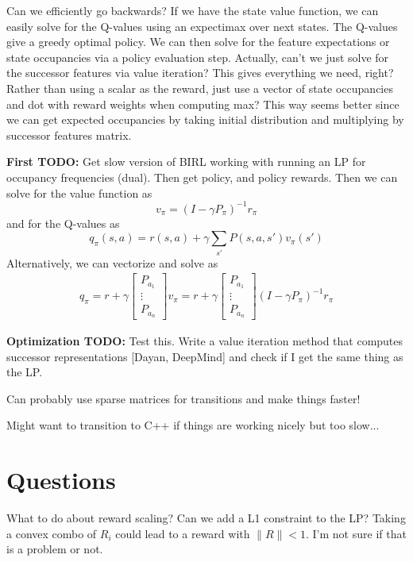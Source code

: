 \documentclass{article}
\begin{document}
Can we efficiently go backwards? If we have the state value function, we can easily solve for the Q-values using an expectimax over next states. The Q-values give a greedy optimal policy. We can then solve for the feature expectations or state occupancies via a policy evaluation step. Actually, can't we just solve for the successor features via value iteration? This gives everything we need, right? Rather than using a scalar as the reward, just use a vector of state occupancies and dot with reward weights when computing max? This way seems better since we can get expected occupancies by taking initial distribution and multiplying by successor features matrix. 

\textbf{First TODO:}
Get slow version of BIRL working with running an LP for occupancy frequencies (dual). Then get policy, and policy rewards. Then we can solve for the value function as 
\begin{equation}
v_\pi = (I - \gamma P_\pi)^{-1} r_\pi
\end{equation}
and for the Q-values as
\begin{equation}
q_\pi(s,a) = r(s,a) + \gamma \sum_{s'} P(s,a,s') v_\pi(s')
\end{equation}
Alternatively, we can vectorize and solve as 
\begin{eqnarray}
q_\pi = r + \gamma 
\begin{bmatrix}
P_{a_1} \\
\vdots \\
P_{a_n}
\end{bmatrix}
 v_\pi
 = r + \gamma 
\begin{bmatrix}
P_{a_1} \\
\vdots \\
P_{a_n}
\end{bmatrix}
(I - \gamma P_\pi)^{-1} r_\pi
\end{eqnarray}


\textbf{Optimization TODO: }
Test this. Write a value iteration method that computes successor representations [Dayan, DeepMind] and check if I get the same thing as the LP.

Can probably use sparse matrices for transitions and make things faster!

Might want to transition to C++ if things are working nicely but too slow...


\section{Questions}
What to do about reward scaling? Can we add a L1 constraint to the LP? Taking a convex combo of $R_i$ could lead to a reward with $\|R\|<1$. I'm not sure if that is a problem or not.
\end{document}
